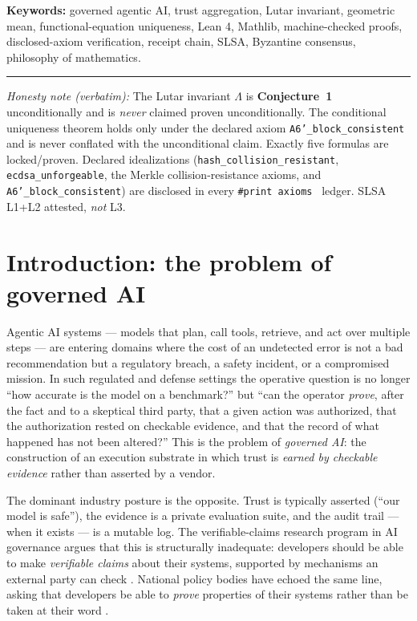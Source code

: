 \documentclass[11pt]{article}
\theoremstyle{plain}
\theoremstyle{definition}
\theoremstyle{remark}
\newcommand{\La}{\Lambda}
\newcommand{\printax}[1]{\texttt{\#print axioms}~\texttt{#1}}
\begin{document}
\noindent\textbf{Keywords:} governed agentic AI, trust aggregation, Lutar
invariant, geometric mean, functional-equation uniqueness, Lean 4, Mathlib,
machine-checked proofs, disclosed-axiom verification, receipt chain, SLSA,
Byzantine consensus, philosophy of mathematics.

\vspace{0.5em}
\hrule
\vspace{0.5em}
\noindent\small\textit{Honesty note (verbatim):} The Lutar invariant $\La$ is
\textbf{Conjecture~1} unconditionally and is \emph{never} claimed proven
unconditionally. The conditional uniqueness theorem holds only under the declared
axiom \texttt{A6'\_block\_consistent} and is never conflated with the unconditional
claim. Exactly five formulas are locked/proven. Declared idealizations
(\texttt{hash\_collision\_resistant}, \texttt{ecdsa\_unforgeable}, the Merkle
collision-resistance axioms, and \texttt{A6'\_block\_consistent}) are disclosed in
every \printax{} ledger. SLSA L1+L2 attested, \emph{not} L3.
\normalsize

\tableofcontents
\newpage

\section{Introduction: the problem of governed AI}
\label{sec:intro}

Agentic AI systems --- models that plan, call tools, retrieve, and act over
multiple steps --- are entering domains where the cost of an undetected error is
not a bad recommendation but a regulatory breach, a safety incident, or a
compromised mission. In such regulated and defense settings the operative question
is no longer ``how accurate is the model on a benchmark?'' but ``can the operator
\emph{prove}, after the fact and to a skeptical third party, that a given action
was authorized, that the authorization rested on checkable evidence, and that the
record of what happened has not been altered?'' This is the problem of
\emph{governed AI}: the construction of an execution substrate in which trust is
\emph{earned by checkable evidence} rather than asserted by a vendor.

The dominant industry posture is the opposite. Trust is typically asserted
(``our model is safe''), the evidence is a private evaluation suite, and the audit
trail --- when it exists --- is a mutable log. The verifiable-claims research
program in AI governance argues that this is structurally inadequate: developers
should be able to make \emph{verifiable claims} about their systems, supported by
mechanisms an external party can check \cite{brundage2020}. National policy bodies
have echoed the same line, asking that developers be able to \emph{prove}
properties of their systems rather than be taken at their word \cite{ntia}.
\end{document}
